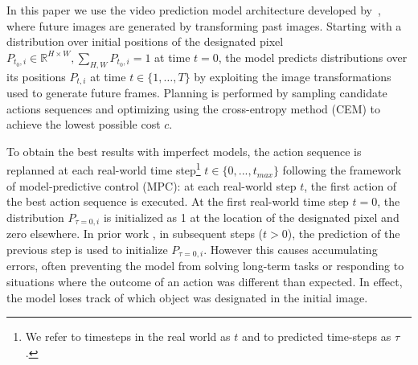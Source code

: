 In this paper we use the video prediction model architecture developed by~\cite{savp}, where future images are generated by transforming past images. Starting with a distribution over initial positions of the designated pixel \mbox{$P_{t_0,i}\in\mathbb{R}^{H\times W}, \sum_{H,W} P_{t_0,i} = 1$} at time $t = 0$, the model predicts distributions over its positions $P_{t,i}$ at time $t \in \{ 1, \dots, T \}$ by exploiting the image transformations used to generate future frames. Planning is performed by sampling candidate actions sequences and optimizing using the cross-entropy method (CEM) \cite{cem-rk-13} to achieve the lowest possible cost $c$.

To obtain the best results with imperfect models, the action sequence is replanned at each real-world time step\footnote{We refer to timesteps in the real world as $t$ and to predicted time-steps as $\tau$.} $t \in \{0,...,t_{max}\}$ following the framework of model-predictive control (MPC): at each real-world step $t$, the first action of the best action sequence is executed. 
At the first real-world time step $t=0$, the distribution $P_{\tau=0,i}$ is initialized as 1 at the location of the designated pixel and zero elsewhere. In prior work \cite{sna, foresight}, in subsequent steps ($t > 0$),  the prediction of the previous step is used to initialize $P_{\tau=0,i}$. However this causes accumulating errors, often preventing the model from solving long-term tasks or responding to situations where the outcome of an action was different than expected. In effect, the model loses track of which object was designated in the initial image.






